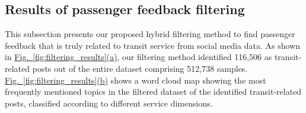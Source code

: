 \documentclass[a4paper,fleqn,12pt]{cas-sc}
\begin{document}



\subsection{Results of passenger feedback filtering}
This subsection presents our proposed hybrid filtering method to find passenger feedback that is truly related to transit service from social media data. As shown in \hyperref[fig:filtering_results]{Fig.~\ref{fig:filtering_results}(a)}, our filtering method identified 116,506 as transit-related posts out of the entire dataset comprising 512,738 samples. \hyperref[fig:filtering_results]{Fig.~\ref{fig:filtering_results}(b)} shows a word cloud map showing the most frequently mentioned topics in the filtered dataset of the identified transit-related posts, classified according to different service dimensions.
\end{document}
